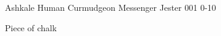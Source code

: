 
\begin{filledCS}%
  {Ashkale}%
  {Human}%
  {Curmudgeon Messenger}%
  {Jester}%
  {{0}{0}{1}}%
  {{0}{-1}{0}}%
  {%
    \setcounter{Athletics}{2}
    \setcounter{Stealth}{1}
    \setcounter{Cultivation}{1}

    \setcounter{Melee}{1}
  }%
  {\charge}%
  {Piece of chalk}%

\end{filledCS}

